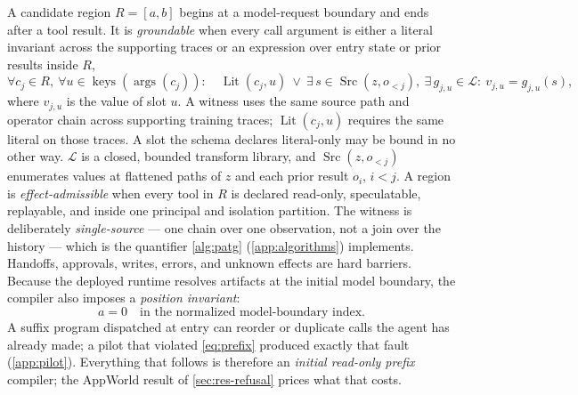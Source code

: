 A candidate region $R=[a,b]$ begins at a model-request boundary and ends after
a tool result. It is \emph{groundable} when every call argument is either a
literal invariant across the supporting traces or an expression over entry
state or prior results inside $R$,
\begin{equation}
  \forall c_j \in R,\ \forall u \in \operatorname{keys}(\operatorname{args}(c_j)):\quad
  \operatorname{Lit}(c_j,u)\ \vee\
  \exists\, s\in\operatorname{Src}(z,o_{<j}),\ \exists\, g_{j,u}\in\mathcal{L}:
  \ v_{j,u} = g_{j,u}(s),
  \label{eq:grounding}
\end{equation}
where $v_{j,u}$ is the value of slot $u$. A witness uses the same source path
and operator chain across supporting training traces; $\operatorname{Lit}(c_j,u)$
requires the same literal on those traces. A slot the
schema declares literal-only may be bound in no other way. $\mathcal{L}$ is a
closed, bounded transform library, and
$\operatorname{Src}(z,o_{<j})$ enumerates values at flattened paths of $z$ and
each prior result $o_i$, $i<j$. A region is \emph{effect-admissible} when every tool in
$R$ is declared read-only, speculatable, replayable, and inside one principal
and isolation partition. The witness is deliberately \emph{single-source} ---
one chain over one observation, not a join over the history --- which is the
quantifier \cref{alg:patg} (\cref{app:algorithms}) implements. Handoffs, approvals, writes, errors, and
unknown effects are hard barriers.
Because the deployed runtime resolves artifacts at the initial model boundary,
the compiler also imposes a \emph{position invariant}:
\begin{equation}
  a = 0 \quad\text{in the normalized model-boundary index.}
  \label{eq:prefix}
\end{equation}
A suffix program dispatched at entry can reorder or duplicate calls the agent
has already made; a pilot that violated \cref{eq:prefix} produced exactly that
fault (\cref{app:pilot}). Everything that follows is therefore an \emph{initial
read-only prefix} compiler; the AppWorld result of \cref{sec:res-refusal} prices what that costs.

